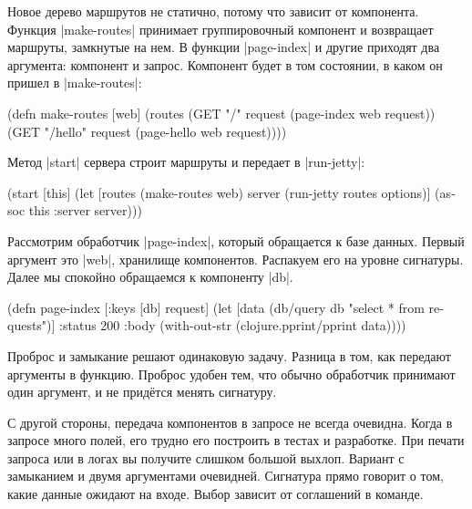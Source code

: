 Новое дерево маршрутов не статично, потому что зависит от компонента. Функция
\spverb|make-routes| принимает группировочный компонент и возвращает маршруты,
замкнутые на нем. В функции \spverb|page-index| и другие приходят два аргумента:
компонент и запрос. Компонент будет в том состоянии, в каком он пришел в
\spverb|make-routes|:

\begin{english}
  \begin{clojure}
(defn make-routes [web]
  (routes
   (GET "/"      request (page-index web request))
   (GET "/hello" request (page-hello web request))))
  \end{clojure}
\end{english}

\noindent
Метод \spverb|start| сервера строит маршруты и передает в \spverb|run-jetty|:

\begin{english}
  \begin{clojure}
(start [this]
  (let [routes (make-routes web)
        server (run-jetty routes options)]
    (assoc this :server server)))
  \end{clojure}
\end{english}

Рассмотрим обработчик \spverb|page-index|, который обращается к базе
данных. Первый аргумент это \spverb|web|, хранилище компонентов. Распакуем его
на уровне сигнатуры. Далее мы спокойно обращаемся к компоненту \spverb|db|.

\begin{english}
  \begin{clojure}
(defn page-index
  [{:keys [db]} request]
  (let [data (db/query db "select * from requests")]
    {:status 200
     :body (with-out-str
             (clojure.pprint/pprint data))}))
  \end{clojure}
\end{english}

Проброс и замыкание решают одинаковую задачу. Разница в том, как передают
аргументы в функцию. Проброс удобен тем, что обычно обработчик принимают один
аргумент, и не прид\"{е}тся менять сигнатуру.

С другой стороны, передача компонентов в запросе не всегда очевидна. Когда в
запросе много полей, его трудно его построить в тестах и разработке. При печати
запроса или в логах вы получите слишком большой выхлоп. Вариант с замыканием и
двумя аргументами очевидней. Сигнатура прямо говорит о том, какие данные ожидают
на входе. Выбор зависит от соглашений в команде.


